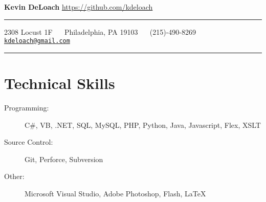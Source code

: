 \documentclass[11pt]{article}
\newcommand{\spacer}{ \textbullet \ \ }
\begin{document}
\noindent
{\Huge\bfseries Kevin DeLoach} \hfill
\url{https://github.com/kdeloach}

\vspace{1em}
\hrule

\begin{center}
    2308 Locust 1F         \spacer
    Philadelphia, PA 19103 \spacer
    (215)-490-8269         \spacer
    \href{mailto:kdeloach@gmail.com}{\texttt{kdeloach@gmail.com}}
\end{center}

\vspace{-0.5em}
\hrule

\section*{Technical Skills}
\begin{description}
    \item[Programming:]%
        C\#, VB, .NET, SQL, MySQL, PHP, Python, Java, Javascript, Flex, XSLT
    \item[Source Control:]%
        Git, Perforce, Subversion
    \item[Other:]%
        Microsoft Visual Studio, Adobe Photoshop, Flash, \LaTeX
\end{description}
\end{document}
